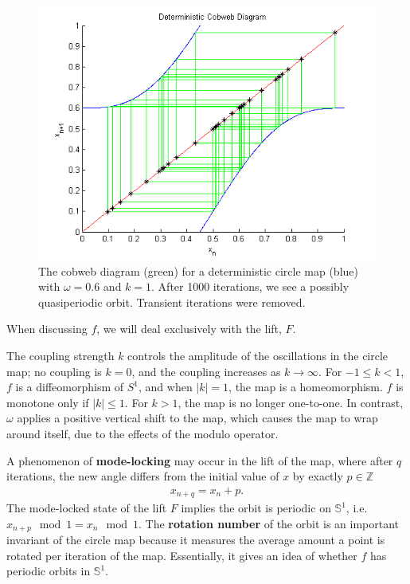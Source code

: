 \begin{figure}[!h]
\caption[Deterministic circle map, quasiperiodic orbit]{The cobweb
  diagram (green) for a deterministic circle map (blue) with $\omega =
  0.6$ and $k=1$. After 1000 iterations, we see a possibly quasiperiodic orbit. Transient iterations were removed.}\label{fig:rcircunstable}
	\begin{center}
		\includegraphics[scale=0.7]{figs/detcirc_cobweb_chaos.png}
	\end{center}
\end{figure}
When discussing $f$, we will deal exclusively with the
lift, $F$.

The coupling strength $k$ controls the amplitude of the oscillations in the circle map; no
coupling is $k=0$, and the coupling increases as $k \to
\infty$. For $-1 \leq k < 1$, $f$ is a diffeomorphism of $S^1$, and
when $|k|=1$, the map is a homeomorphism. $f$ is monotone only if
$|k|\leq 1$. For $k>1$, the map is no
longer one-to-one. In contrast, $\omega$
applies a positive vertical shift to the map, which causes the map to wrap
around itself, due to the effects of the modulo operator. 

A phenomenon of \textbf{mode-locking} may occur in the lift of the map,
where after $q$ iterations, the new angle differs from the initial
value of $x$ by exactly $p \in \mathbb{Z}$
\begin{align*}
x_{n+q}=x_n+p.
\end{align*}
The mode-locked state of the lift $F$ implies the orbit is periodic
on $\mathbb{S}^1$, i.e. $x_{n+p} \mod 1 = x_n \mod 1$. The \textbf{rotation number} of the orbit is an important invariant of
the circle map because it measures the average amount a point is rotated per iteration of the map. Essentially, it gives an idea of
whether $f$ has periodic orbits in $\mathbb{S}^1$.

